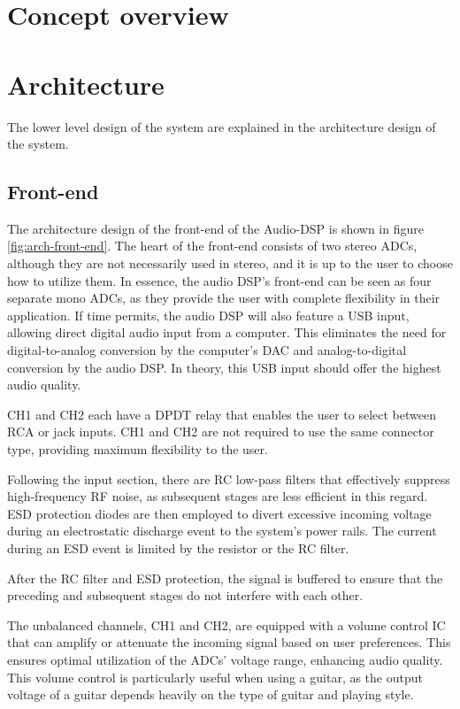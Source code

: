 \section{Concept overview}

\section{Architecture}
The lower level design of the system are explained in the architecture design of the system. 

\subsection{Front-end}
The architecture design of the front-end of the Audio-DSP is shown in figure \ref{fig:arch-front-end}. The heart of the front-end consists of two stereo ADCs, although they are not necessarily used in stereo, and it is up to the user to choose how to utilize them. In essence, the audio DSP's front-end can be seen as four separate mono ADCs, as they provide the user with complete flexibility in their application. If time permits, the audio DSP will also feature a USB input, allowing direct digital audio input from a computer. This eliminates the need for digital-to-analog conversion by the computer's DAC and analog-to-digital conversion by the audio DSP. In theory, this USB input should offer the highest audio quality.

CH1 and CH2 each have a DPDT relay that enables the user to select between RCA or jack inputs. CH1 and CH2 are not required to use the same connector type, providing maximum flexibility to the user.

Following the input section, there are RC low-pass filters that effectively suppress high-frequency RF noise, as subsequent stages are less efficient in this regard. ESD protection diodes are then employed to divert excessive incoming voltage during an electrostatic discharge event to the system's power rails. The current during an ESD event is limited by the resistor or the RC filter.

After the RC filter and ESD protection, the signal is buffered to ensure that the preceding and subsequent stages do not interfere with each other.

The unbalanced channels, CH1 and CH2, are equipped with a volume control IC that can amplify or attenuate the incoming signal based on user preferences. This ensures optimal utilization of the ADCs' voltage range, enhancing audio quality. This volume control is particularly useful when using a guitar, as the output voltage of a guitar depends heavily on the type of guitar and playing style.


